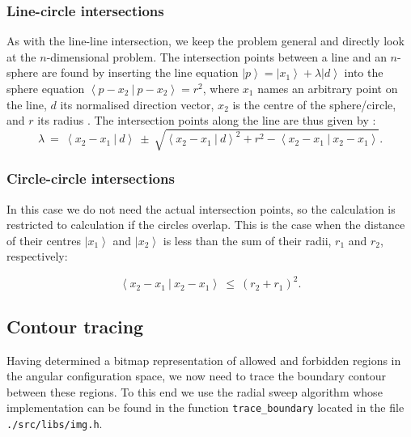\subsubsection*{Line-circle intersections}
As with the line-line intersection, we keep the problem general and directly look at the $n$-dimensional problem.
The intersection points between a line and an $n$-sphere are found by inserting the line equation 
$\left|p\right> = \left|x_1\right> + \lambda \left|d\right>$ into the sphere equation 
$\left< p-x_2 \ |\  p-x_2 \right> = r^2$, where $x_1$ names an arbitrary point on the line, $d$ its normalised 
direction vector, $x_2$ is the centre of the sphere/circle, and $r$ its radius \cite{wiki_line_sphere_intersection}.
The intersection points along the line are thus given by \cite{wiki_line_sphere_intersection}:
\begin{equation}
	\lambda \ =\ \left< x_2 - x_1 \  |\  d \right>
		\ \pm\ \sqrt{ \left< x_2 - x_1 \  |\  d \right>^2 
			+ r^2 - \left< x_2 - x_1 \ |\  x_2 - x_1 \right>}.
\end{equation}



\subsubsection*{Circle-circle intersections}
In this case we do not need the actual intersection points, so the calculation is restricted to calculation if
the circles overlap. This is the case when the distance of their centres $\left| x_1 \right>$ and $\left| x_2 \right>$ 
is less than the sum of their radii, $r_1$ and $r_2$, respectively:

\begin{equation}
	\left< x_2 - x_1 \ |\ x_2 - x_1  \right> \ \leq \ \left( r_2 + r_1 \right)^2.
\end{equation}



\subsection{Contour tracing}
\label{sec:contourtracing}
Having determined a bitmap representation of allowed and forbidden regions in the angular configuration space,
we now need to trace the boundary contour between these regions.
To this end we use the radial sweep algorithm \cite{web_radial_sweep} whose implementation can be found
in the function \lstinline[language=C++]|trace_boundary| located in the file \lstinline|./src/libs/img.h|.


